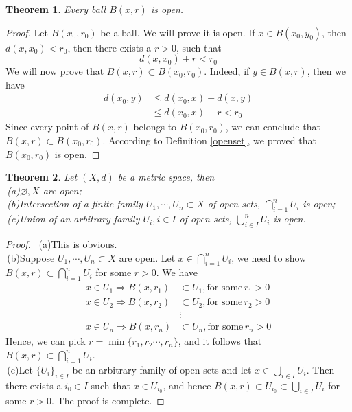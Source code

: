 \documentclass[12pt,leqno]{amsart}
\newtheorem{theorem}{Theorem}[section]
\theoremstyle{definition}
\begin{document}
\begin{theorem}
Every ball $B(x,r)$ is open.
\end{theorem}
\begin{proof}
Let $B(x_0,r_0)$ be a ball. We will prove it is open. If $x\in B(x_0, y_0)$, then $d(x, x_0)<r_0$, then there exists a $r>0$, such that $$d(x,x_0)+r < r_0$$
We will now prove that $B(x,r)\subset B(x_0,r_0)$. Indeed, if $y\in B(x,r)$, then we have 
\begin{align*}
    d(x_0,y) & \leq d(x_0,x) + d(x,y) \\
    & \leq d(x_0,x) + r < r_0
\end{align*}
Since every point of $B(x,r)$ belongs to $B(x_0,r_0)$, we can conclude that $B(x,r)\subset B(x_0,r_0)$. According to Definition \ref{openset}, we proved that $B(x_0,r_0)$ is open.
\end{proof}


\begin{theorem}
Let $(X,d)$ be a metric space, then\\
\hspace*{1em}\,(a)$\varnothing, X$ are open;\\
\hspace*{1em}\,(b)Intersection of a finite family $U_1, \cdots, U_n \subset X$ of open sets, $\bigcap^n_{i=1}U_i$ is open;\\
\hspace*{1em}\,(c)Union of an arbitrary family $U_i,i\in I$ of open sets, $\bigcup^n_{i\in I}U_i$ is open.
\end{theorem}
\begin{proof}
$ $\newline 
\hspace*{1em}\,(a)This is obvious.\\
\hspace*{1em}\,(b)Suppose $U_1, \cdots, U_n \subset X$ are open. Let $x\in \bigcap^n_{i=1}U_i$, we need to show $B(x,r)\subset \bigcap^n_{i=1}U_i$ for some $r>0$. We have 
\begin{align*}
    x\in U_1 \Rightarrow B(x,r_1) & \subset U_1, \text{for some} \, r_1 > 0 \\
    x\in U_2 \Rightarrow B(x,r_2) & \subset U_2, \text{for some} \, r_2 > 0 \\
    & \vdots \\
    x\in U_n \Rightarrow B(x,r_n) & \subset U_n, \text{for some} \, r_n > 0
\end{align*}
\hspace*{1em}Hence, we can pick $r = \min\{r_1, r_2\cdots,r_n\}$, and it follows that $B(x,r) \subset \bigcap^n_{i=1}U_i$.\\
\hspace*{1em}\,(c)Let $\{U_i\}_{i\in I}$ be an arbitrary family of open sets and let $x\in \bigcup_{i\in I}U_i$. Then there exists a $i_0\in I$ such that $x\in U_{i_0}$, and hence $B(x,r) \subset U_{i_0} \subset \bigcup_{i\in I}U_i$ for some $r>0$. The proof is complete.
\end{proof}
\end{document}
